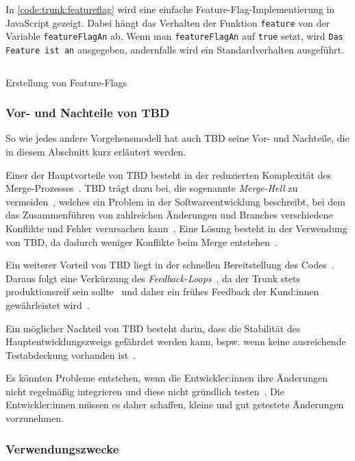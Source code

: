In \autoref{code:trunk:featureflag} wird eine  einfache Feature\hyp Flag\hyp Implementierung in JavaScript gezeigt. Dabei hängt das Verhalten der Funktion \texttt{feature} von der Variable \texttt{featureFlagAn} ab. Wenn man \texttt{featureFlagAn} auf \texttt{true} setzt, wird \texttt{Das Feature ist an} ausgegeben, andernfalls wird ein Standardverhalten ausgeführt.

\begin{listing}
    \inputminted[breaklines]{js}{src/assets/code/trunk/featureflags.js}
    \caption{Erstellung von Feature\hyp Flags}
    \label{code:trunk:featureflag}
\end{listing}  

\subsubsection{Vor- und Nachteile von TBD}
\label{trunk:vn}

So wie jedes andere Vorgehensmodell hat auch TBD seine Vor- und Nachteile, die in diesem Abschnitt kurz erläutert werden.

Einer der Hauptvorteile von TBD besteht in der reduzierten Komplexität des Merge\hyp Prozesses~\cite{trunkbased2}. TBD trägt dazu bei, die sogenannte \emph{Merge\hyp Hell} zu vermeiden~\cite{trunkbased2}, welches ein Problem in der Softwareentwicklung beschreibt, bei dem das Zusammenführen von zahlreichen Änderungen und Branches verschiedene Konflikte und Fehler verursachen kann~\cite{trunkbased8}. Eine Lösung besteht in der Verwendung von TBD, da dadurch weniger Konflikte beim Merge entstehen~\cite{trunkbased1}.

Ein weiterer Vorteil von TBD liegt in der schnellen Bereitstellung des Codes~\cite{trunkbased8}. Daraus folgt eine Verkürzung des \emph{Feedback\hyp Loops}~\cite{trunkbased2}, da der Trunk stets produktionsreif sein sollte~\cite{trunkbased1} und daher ein frühes Feedback der Kund:innen gewährleistet wird~\cite{trunkbased2}.

Ein möglicher Nachteil von TBD besteht darin, dass die Stabilität des Hauptentwicklungszweigs gefährdet werden kann, bspw. wenn keine ausreichende Testabdeckung vorhanden ist~\cite{trunkbased1}.

Es könnten Probleme entstehen, wenn die Entwickler:innen ihre Änderungen nicht regelmäßig integrieren und diese nicht gründlich testen~\cite{trunkbased1}. 
Die Entwickler:innen müssen es daher schaffen, kleine und gut getestete Änderungen vorzunehmen.

\subsubsection{Verwendungszwecke}

